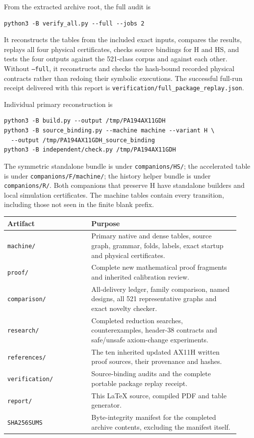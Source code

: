 \documentclass[11pt,a4paper]{article}
\begin{document}
From the extracted archive root, the full audit is
\begin{verbatim}
python3 -B verify_all.py --full --jobs 2
\end{verbatim}
It reconstructs the tables from the included exact inputs, compares the
results, replays all four physical certificates, checks source bindings
for H and HS, and tests the four outputs against the 521-class corpus and
against each other. Without \texttt{--full}, it reconstructs and checks
the hash-bound recorded physical contracts rather than redoing their
symbolic executions. The successful full-run receipt delivered with this
report is \texttt{verification/full\_package\_replay.json}.

Individual primary reconstruction is
\begin{verbatim}
python3 -B build.py --output /tmp/PA194AX11GDH
python3 -B source_binding.py --machine machine --variant H \
  --output /tmp/PA194AX11GDH_source_binding
python3 -B independent/check.py /tmp/PA194AX11GDH
\end{verbatim}
The symmetric standalone bundle is under \texttt{companions/HS/}; the
accelerated table is under \texttt{companions/F/machine/}; the history
helper bundle is under \texttt{companions/R/}. Both companions that preserve
H have standalone builders and local simulation certificates. The
machine tables contain every transition, including those not seen in
the finite blank prefix.

\begin{center}
\small
\begin{tabular}{@{}p{0.34\linewidth}p{0.60\linewidth}@{}}
\toprule
Artifact & Purpose\\\midrule
\texttt{machine/} & Primary native and dense tables, source graph,
 grammar, folds, labels, exact startup and physical certificates.\\
\texttt{proof/} & Complete new mathematical proof fragments and inherited
 calibration review.\\
\texttt{comparison/} & All-delivery ledger, family comparison, named
 designs, all 521 representative graphs and exact novelty checker.\\
\texttt{research/} & Completed reduction searches, counterexamples,
 header-38 contracts and safe/unsafe axiom-change experiments.\\
\texttt{references/} & The ten inherited updated AX11H written proof
 sources, their provenance and hashes.\\
\texttt{verification/} & Source-binding audits and the complete portable
 package replay receipt.\\
\texttt{report/} & This \LaTeX{} source, compiled PDF and table generator.\\
\texttt{SHA256SUMS} & Byte-integrity manifest for the completed archive
 contents, excluding the manifest itself.\\
\bottomrule
\end{tabular}
\end{center}
\end{document}
